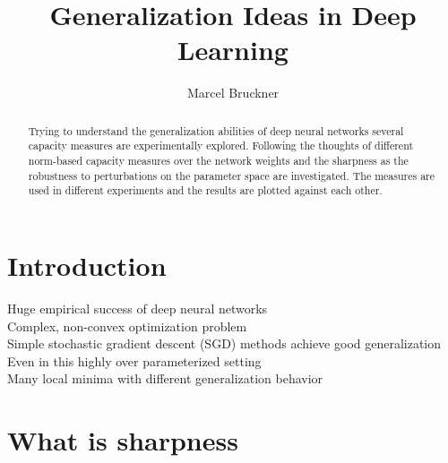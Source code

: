 \documentclass[a4paper,10pt]{article}
\title{Generalization Ideas in Deep Learning} %
\author{Marcel Bruckner} %
\institute{\textit{Seminar: Optimization and Generalization in Deep Learning}}
\begin{document}
\maketitle

\begin{abstract}
Trying to understand the generalization abilities of deep neural networks several capacity measures are experimentally explored. Following the thoughts of \cite{neyshabur2017exploring} different norm-based capacity measures over the network weights and the sharpness as the robustness to perturbations on the parameter space are investigated. The measures are used in different experiments and the results are plotted against each other.
\end{abstract}

\section{Introduction}
Huge empirical success of deep neural networks \\
Complex, non-convex optimization problem \\
Simple stochastic gradient descent (SGD) methods achieve good generalization \\
Even in this highly over parameterized setting \\
Many local minima with different generalization behavior 
%


\section{What is sharpness}

\newpage


\newpage


\newpage

\nocite{*}



\end{document}
